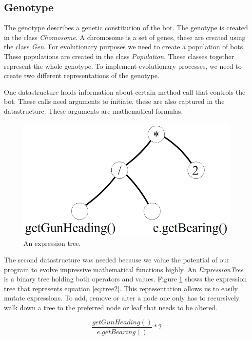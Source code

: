 \documentclass[a4paper,10pt]{article}
\begin{document}
\subsection{Genotype}
The genotype describes a genetic constitution of the bot. The genotype is created in the class \textit{Chomosome}. A chromosome is a set of genes, these are created using the class \textit{Gen}. For evolutionary purposes we need to create a population of bots. These populations are created in the class \textit{Population}. These classes together represent the whole genotype.
To implement evolutionary processes, we need to create two different representations of the genotype.

One datastructure holds information about certain method call that controls the bot.
These calls need arguments to initiate, these are also captured in the datastructure. These arguments are mathematical formulas.

\begin{figure}
    \centering
    \includegraphics[scale=0.2]{tree}
    \caption{An expression tree.}
    \label{fig:tree1}
\end{figure}     

The second datastructure was needed because we value the potential of our program to evolve impressive 
mathematical functions highly. An \textit{ExpressionTree} is a binary tree holding both operators and 
values. Figure \ref{fig:tree1} shows the expression tree that represents equation \ref{eq:tree2}. 
This representation allows us to easily mutate expressions. To add, remove or alter a node 
one only has to recursively walk down a tree to the preferred node or leaf that needs to be altered.  

\begin{equation}
    \frac{getGunHeading()}{e.getBearing()}*2
    \label{eq:tree2}
\end{equation}
\end{document}

